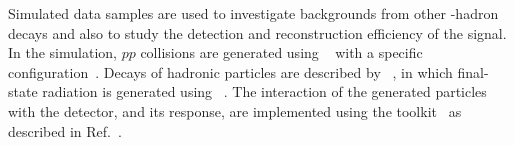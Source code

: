 Simulated data samples are used to investigate backgrounds from other
\bquark-hadron decays and also to study the detection and reconstruction
efficiency of the signal.
In the simulation, $pp$ collisions are generated using
\pythia~\cite{Sjostrand:2007gs,*Sjostrand:2006za} with a specific \lhcb
configuration~\cite{LHCb-PROC-2010-056}.
Decays of hadronic particles are described by \evtgen~\cite{Lange:2001uf},
in which final-state radiation is generated using
\photos~\cite{Golonka:2005pn}.
The interaction of the generated particles with the detector, and its
response, are implemented using the \geant toolkit~\cite{Allison:2006ve,
*Agostinelli:2002hh} as described in Ref.~\cite{LHCb-PROC-2011-006}.

